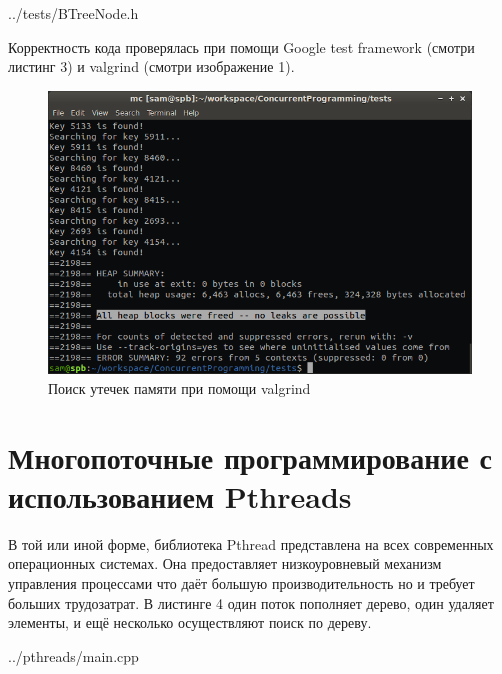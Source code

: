 \documentclass[a4paper, 12pt]{report}		%
\begin{document}

{../tests/BTreeNode.h}

Корректность кода проверялась при помощи Google test framework (смотри листинг 3) и valgrind (смотри изображение 1).



\begin{figure}[h!]
\centering
\includegraphics[scale=0.68]{res/valgrind}
\caption{Поиск утечек памяти при помощи valgrind}
\end{figure}


\chapter*{Многопоточные программирование с использованием Pthreads}

В той или иной форме, библиотека Pthread представлена на всех современных операционных системах. Она предоставляет низкоуровневый механизм управления процессами что даёт большую производительность но и требует больших трудозатрат. В листинге 4 один поток пополняет дерево, один удаляет элементы, и ещё несколько осуществляют поиск по дереву.


{../pthreads/main.cpp}

\end{document}
